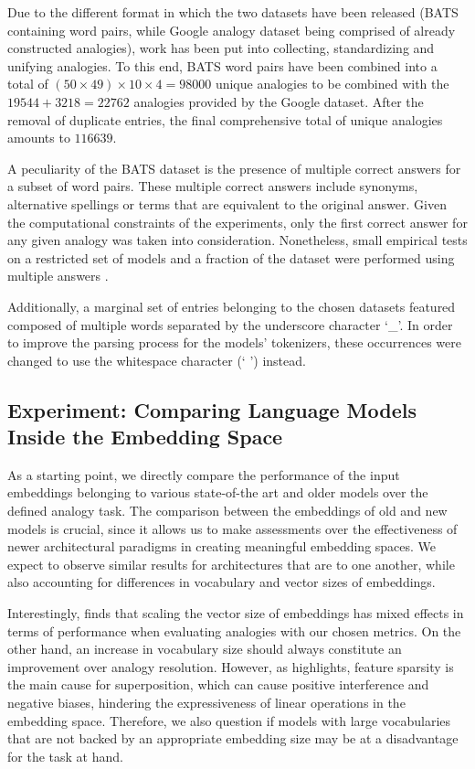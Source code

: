 Due to the different format in which the two datasets have been released (BATS containing word pairs, while Google analogy dataset being comprised of already constructed analogies),  work has been put into collecting, standardizing and unifying analogies.
To this end, BATS word pairs have been combined into a total of $(50 \times 49) \times 10 \times 4 = 98000$ unique analogies to be combined with the $19544 + 3218 = 22762$ analogies provided by the Google dataset.
After the removal of duplicate entries, the final comprehensive total of unique analogies amounts to $116639$.

A peculiarity of the BATS dataset is the presence of multiple correct answers for a subset of word pairs.
These multiple correct answers include synonyms, alternative spellings or terms that are equivalent to the original answer.
Given the computational constraints of the experiments, only the first correct answer for any given analogy was taken into consideration.
Nonetheless, small empirical tests on a restricted set of models and a fraction of the dataset were performed using multiple answers .

Additionally, a marginal set of entries belonging to the chosen datasets featured  composed of multiple words separated by the underscore character `\_'.
In order to improve the parsing process for the models' tokenizers, these occurrences were changed to use the whitespace character (` ') instead.

\subsection{Experiment: Comparing Language Models \texorpdfstring{\linebreak}{} Inside the Embedding Space}\label{ssec:exp_emb_exp1}

As a starting point, we directly compare the performance of the input embeddings belonging to various state-of-the art and older models over the defined analogy task.
The comparison between the embeddings of old and new models is crucial, since it allows us to make assessments over the effectiveness of newer architectural paradigms in creating meaningful embedding spaces.
We expect to observe similar results for architectures that are  to one another, while also accounting for differences in vocabulary and vector sizes of embeddings.

Interestingly, \citet{drozd2016} finds that scaling the vector size of embeddings has mixed effects in terms of performance when evaluating analogies with our chosen metrics.
On the other hand, an increase in vocabulary size should always constitute an improvement over analogy resolution.
However, as \citet{elhage2022} highlights, feature sparsity is the main cause for superposition, which can cause positive interference and negative biases, hindering the expressiveness of linear operations in the embedding space.
Therefore, we also question if models with large vocabularies that are not backed by an appropriate embedding size may be at a disadvantage for the task at hand.

